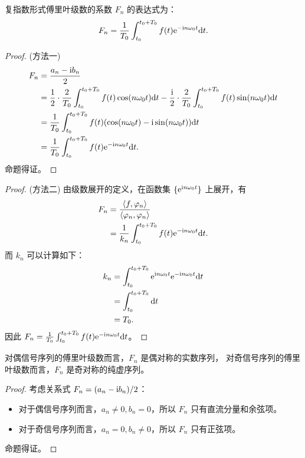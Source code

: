 \begin{property}
    复指数形式傅里叶级数的系数 $F_n$ 的表达式为：
    \begin{align*}
        F_n = \frac{1}{T_0}\int_{t_0}^{t_0 + T_0}f(t)\mathrm{e}^{-\mathrm{i} n\omega_0 t}\mathrm{d}t.
    \end{align*}
\end{property}

\begin{proof}
    (方法一)
    \begin{align*}
        F_n & = \frac{a_n - \mathrm{i} b_n}{2} \\
        & = \frac{1}{2} \cdot \frac{2}{T_0}\int_{t_0}^{t_0 + T_0}f(t)\cos(n\omega_0 t)\mathrm{d}t - \frac{\mathrm{i}}{2} \cdot \frac{2}{T_0}\int_{t_0}^{t_0 + T_0}f(t)\sin(n\omega_0 t)\mathrm{d}t \\
        & = \frac{1}{T_0}\int_{t_0}^{t_0 + T_0}f(t)(\cos(n\omega_0 t) - \mathrm{i} \sin(n\omega_0 t))\mathrm{d}t \\
        & = \frac{1}{T_0}\int_{t_0}^{t_0 + T_0}f(t)\mathrm{e}^{-\mathrm{i} n\omega_0 t}\mathrm{d}t.
    \end{align*}
    命题得证。
\end{proof}

\begin{proof}
    (方法二)
    由级数展开的定义，在函数集 $\{\mathrm{e}^{\mathrm{i} n\omega_0 t}\}$ 上展开，有
    \begin{align*}
        F_n & = \frac{\left\langle f, \varphi_n\right\rangle}{\left\langle\varphi_n, \varphi_n\right\rangle}\\
        & = \frac{1}{k_n}\int_{t_0}^{t_0 + T_0}f(t) \mathrm{e}^{-\mathrm{i} n\omega_0 t}\mathrm{d}t.
    \end{align*}
    而 $k_n$ 可以计算如下：
    \begin{align*}
        k_n & = \int_{t_0}^{t_0 + T_0}\mathrm{e}^{\mathrm{i} n\omega_0 t}\mathrm{e}^{-\mathrm{i} n\omega_0 t}\mathrm{d}t \\
        & = \int_{t_0}^{t_0 + T_0}\mathrm{d}t \\
        & = T_0.
    \end{align*}
    因此 $F_n = \frac{1}{T_0}\int_{t_0}^{t_0 + T_0}f(t)\mathrm{e}^{-\mathrm{i} n\omega_0 t}\mathrm{d}t$。
\end{proof}

\begin{property}
    对偶信号序列的傅里叶级数而言，$F_n$ 是偶对称的实数序列，
    对奇信号序列的傅里叶级数而言，$F_n$ 是奇对称的纯虚序列。
\end{property}

\begin{proof}
    考虑关系式 $F_n = (a_n - \mathrm{i} b_n) / 2$：
    \begin{itemize}
        \item 对于偶信号序列而言，$a_n \neq 0, b_n = 0$，所以 $F_n$ 只有直流分量和余弦项。
        \item 对于奇信号序列而言，$a_n = 0, b_n \neq 0$，所以 $F_n$ 只有正弦项。
    \end{itemize}
    命题得证。
\end{proof}

